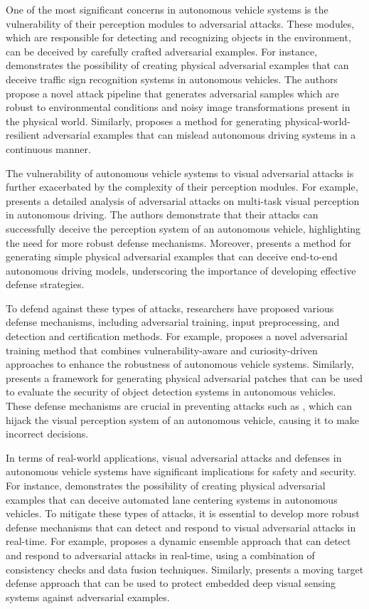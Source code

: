 \documentclass[11pt]{article}
\begin{document}
One of the most significant concerns in autonomous vehicle systems is the vulnerability of their perception modules to adversarial attacks. These modules, which are responsible for detecting and recognizing objects in the environment, can be deceived by carefully crafted adversarial examples. For instance, \cite{ref182} demonstrates the possibility of creating physical adversarial examples that can deceive traffic sign recognition systems in autonomous vehicles. The authors propose a novel attack pipeline that generates adversarial samples which are robust to environmental conditions and noisy image transformations present in the physical world. Similarly, \cite{ref183} proposes a method for generating physical-world-resilient adversarial examples that can mislead autonomous driving systems in a continuous manner.

The vulnerability of autonomous vehicle systems to visual adversarial attacks is further exacerbated by the complexity of their perception modules. For example, \cite{ref17} presents a detailed analysis of adversarial attacks on multi-task visual perception in autonomous driving. The authors demonstrate that their attacks can successfully deceive the perception system of an autonomous vehicle, highlighting the need for more robust defense mechanisms. Moreover, \cite{ref184} presents a method for generating simple physical adversarial examples that can deceive end-to-end autonomous driving models, underscoring the importance of developing effective defense strategies.

To defend against these types of attacks, researchers have proposed various defense mechanisms, including adversarial training, input preprocessing, and detection and certification methods. For example, \cite{ref185} proposes a novel adversarial training method that combines vulnerability-aware and curiosity-driven approaches to enhance the robustness of autonomous vehicle systems. Similarly, \cite{ref186} presents a framework for generating physical adversarial patches that can be used to evaluate the security of object detection systems in autonomous vehicles. These defense mechanisms are crucial in preventing attacks such as \cite{ref187}, which can hijack the visual perception system of an autonomous vehicle, causing it to make incorrect decisions.

In terms of real-world applications, visual adversarial attacks and defenses in autonomous vehicle systems have significant implications for safety and security. For instance, \cite{ref188} demonstrates the possibility of creating physical adversarial examples that can deceive automated lane centering systems in autonomous vehicles. To mitigate these types of attacks, it is essential to develop more robust defense mechanisms that can detect and respond to visual adversarial attacks in real-time. For example, \cite{ref189} proposes a dynamic ensemble approach that can detect and respond to adversarial attacks in real-time, using a combination of consistency checks and data fusion techniques. Similarly, \cite{ref190} presents a moving target defense approach that can be used to protect embedded deep visual sensing systems against adversarial examples.
\end{document}
